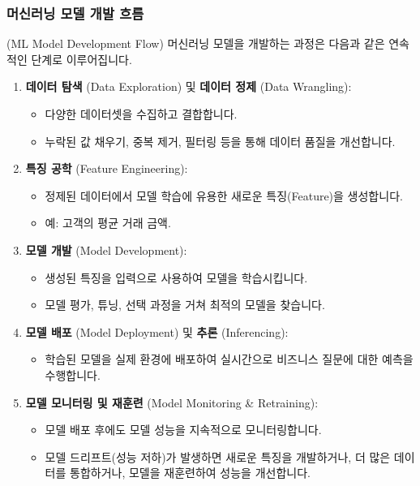 \documentclass[11pt,a4paper]{article}
\theoremstyle{definition}
\begin{document}
\subsubsection*{머신러닝 모델 개발 흐름} (ML Model Development Flow)
머신러닝 모델을 개발하는 과정은 다음과 같은 연속적인 단계로 이루어집니다.
\begin{enumerate}
    \item \textbf{데이터 탐색} (Data Exploration) 및 \textbf{데이터 정제} (Data Wrangling):
    \begin{itemize}
        \item 다양한 데이터셋을 수집하고 결합합니다.
        \item 누락된 값 채우기, 중복 제거, 필터링 등을 통해 데이터 품질을 개선합니다.
    \end{itemize}
    \item \textbf{특징 공학} (Feature Engineering):
    \begin{itemize}
        \item 정제된 데이터에서 모델 학습에 유용한 새로운 특징(Feature)을 생성합니다.
        \item 예: 고객의 평균 거래 금액.
    \end{itemize}
    \item \textbf{모델 개발} (Model Development):
    \begin{itemize}
        \item 생성된 특징을 입력으로 사용하여 모델을 학습시킵니다.
        \item 모델 평가, 튜닝, 선택 과정을 거쳐 최적의 모델을 찾습니다.
    \end{itemize}
    \item \textbf{모델 배포} (Model Deployment) 및 \textbf{추론} (Inferencing):
    \begin{itemize}
        \item 학습된 모델을 실제 환경에 배포하여 실시간으로 비즈니스 질문에 대한 예측을 수행합니다.
    \end{itemize}
    \item \textbf{모델 모니터링 및 재훈련} (Model Monitoring \& Retraining):
    \begin{itemize}
        \item 모델 배포 후에도 모델 성능을 지속적으로 모니터링합니다.
        \item 모델 드리프트(성능 저하)가 발생하면 새로운 특징을 개발하거나, 더 많은 데이터를 통합하거나, 모델을 재훈련하여 성능을 개선합니다.
    \end{itemize}
\end{enumerate}
\end{document}
